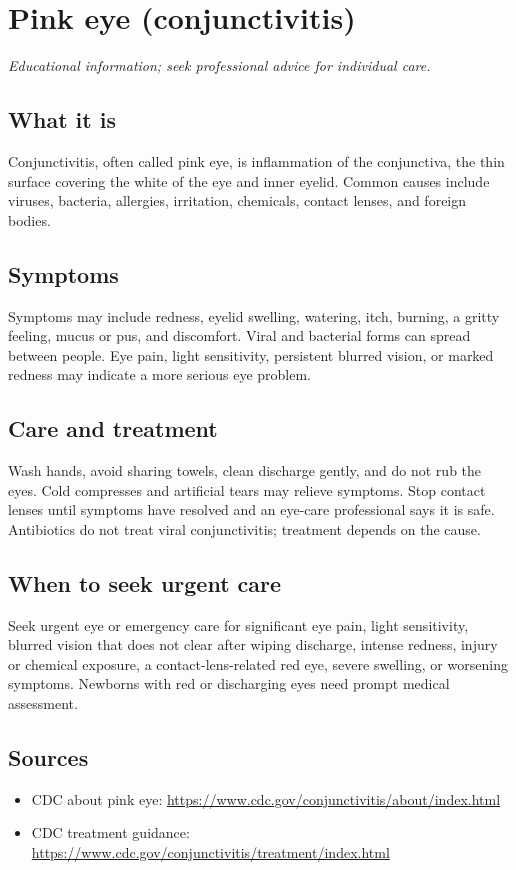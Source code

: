 \chapter{Pink eye (conjunctivitis)}

\medskip
\noindent\textit{Educational information; seek professional advice for individual care.}

\section*{What it is}
Conjunctivitis, often called pink eye, is inflammation of the conjunctiva, the thin surface covering the white of the eye and inner eyelid. Common causes include viruses, bacteria, allergies, irritation, chemicals, contact lenses, and foreign bodies.

\section*{Symptoms}
Symptoms may include redness, eyelid swelling, watering, itch, burning, a gritty feeling, mucus or pus, and discomfort. Viral and bacterial forms can spread between people. Eye pain, light sensitivity, persistent blurred vision, or marked redness may indicate a more serious eye problem.

\section*{Care and treatment}
Wash hands, avoid sharing towels, clean discharge gently, and do not rub the eyes. Cold compresses and artificial tears may relieve symptoms. Stop contact lenses until symptoms have resolved and an eye-care professional says it is safe. Antibiotics do not treat viral conjunctivitis; treatment depends on the cause.

\section*{When to seek urgent care}
Seek urgent eye or emergency care for significant eye pain, light sensitivity, blurred vision that does not clear after wiping discharge, intense redness, injury or chemical exposure, a contact-lens-related red eye, severe swelling, or worsening symptoms. Newborns with red or discharging eyes need prompt medical assessment.

\section*{Sources}
\begin{itemize}
\item CDC about pink eye: \url{https://www.cdc.gov/conjunctivitis/about/index.html}
\item CDC treatment guidance: \url{https://www.cdc.gov/conjunctivitis/treatment/index.html}
\end{itemize}
